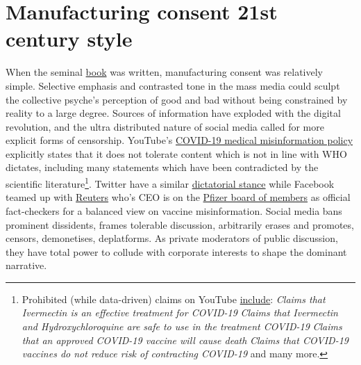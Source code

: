 \documentclass[11pt,a4paper,notitlepage]{report}
\begin{document}

\section*{Manufacturing consent 21st century style}

When the seminal \href{https://en.wikipedia.org/wiki/Manufacturing_Consent}{book} was written, manufacturing consent was  relatively simple. Selective emphasis and contrasted tone in the mass media could sculpt the collective psyche's perception of good and bad without being constrained by reality to a large degree. Sources of information have exploded with the digital revolution, and the ultra distributed nature of social media called for more explicit forms of censorship. YouTube's \href{https://support.google.com/youtube/answer/9891785}{COVID-19 medical misinformation policy} explicitly states that it does not tolerate content which is not in line with WHO dictates, including many statements which have been contradicted by the scientific literature\footnote{Prohibited (while data-driven) claims on YouTube \href{https://support.google.com/youtube/answer/9891785}{include}: \textit{Claims that Ivermectin is an effective treatment for COVID-19} \cite{Kerr2022-ps} \cite{EFIMENKO2022S40} \textit{Claims that Ivermectin and Hydroxychloroquine are safe to use in the treatment COVID-19} \cite{wentzel2021} \textit{Claims that an approved COVID-19 vaccine will cause death} \cite{cdc14032022} \textit{Claims that COVID-19 vaccines do not reduce risk of contracting COVID-19} \cite{Hansen2021.12.20.21267966} and many more.}. Twitter have a similar  \href{https://help.twitter.com/en/rules-and-policies/medical-misinformation-policy}{dictatorial stance} while Facebook teamed up with \href{https://www.reuters.com/article/us-facebook-partnership-reuters-idUSKBN2062K4}{Reuters} \cite{reuters12022020} who's CEO is on the \href{https://www.pfizer.com/people/leadership/board_of_directors/james_smith}{Pfizer board of members} \cite{pfizer-james-smith} as official fact-checkers for a balanced view on vaccine misinformation. Social media bans prominent dissidents, frames tolerable discussion, arbitrarily erases and promotes, censors, demonetises, deplatforms. As private moderators of public discussion, they have total power to collude with corporate interests to shape the dominant narrative.
\end{document}
